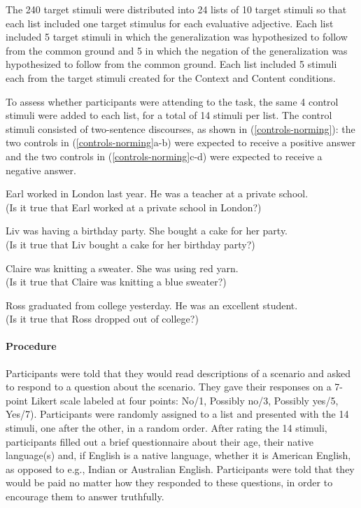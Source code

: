 \documentclass[11pt,fleqn]{article}
\newcommand{\6}{\mbox{$[\hspace*{-.6mm}[$}}
\newcommand{\9}{\mbox{$]\hspace*{-.6mm}]$}}
\begin{document}
The 240 target stimuli were distributed into 24 lists of 10 target stimuli so that each list included one target stimulus for each evaluative adjective. Each list included 5 target stimuli in which the generalization was hypothesized to follow from the common ground and 5 in which the negation of the generalization was hypothesized to follow from the common ground. Each list included 5 stimuli each from the target stimuli created for the Context and Content conditions.

To assess whether participants were attending to the task, the same 4 control stimuli were added to each list, for a total of 14 stimuli per list. The control stimuli consisted of two-sentence discourses, as shown in (\ref{controls-norming}): the two controls in (\ref{controls-norming}a-b) were expected to receive a positive answer and the two controls in (\ref{controls-norming}c-d) were expected to receive a negative answer.

\begin{exe}
\ex\label{controls-norming}
\begin{xlist}
\ex Earl worked in London last year. He was a teacher at a private school. 
\\ (Is it true that Earl worked at a private school in London?)

\ex Liv was having a birthday party. She bought a cake for her party.
\\ (Is it true that Liv bought a cake for her birthday party?)

\ex Claire was knitting a sweater. She was using red yarn. 
\\ (Is it true that Claire was knitting a blue sweater?)

\ex Ross graduated from college yesterday. He was an excellent student. 
\\ (Is it true that Ross dropped out of college?)

\end{xlist}
\end{exe}

\paragraph{Procedure}

Participants were told that they would read descriptions of a scenario and asked to respond to a question about the scenario. They gave their responses on a 7-point Likert scale labeled at four points: No/1, Possibly no/3, Possibly yes/5,
Yes/7). Participants were randomly assigned to a list and presented with the 14 stimuli, one after the other, in a random order. After rating the 14 stimuli, participants filled out a brief questionnaire about their age, their native language(s) and, if English is a native language, whether it is American English, as opposed to e.g., Indian or Australian English. Participants were told that they would be paid no matter how they
responded to these questions, in order to encourage them to answer
truthfully.
\end{document}
